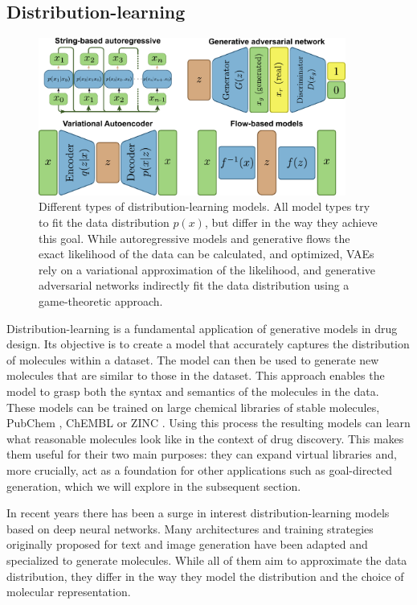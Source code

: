 \subsection{Distribution-learning}
\begin{figure}
      \centering
      \includegraphics[width=0.9\textwidth]{figures/distribution-learning-models.pdf}
      \caption{Different types of distribution-learning models. All model types
            try to fit the data distribution $p(x)$, but differ in the way they achieve this goal.
            While autoregressive models and generative flows the exact likelihood of the data can be calculated,
            and optimized, VAEs rely on a variational approximation of the likelihood, and generative adversarial networks
            indirectly fit the data distribution using a game-theoretic approach. \label{fig:distribution-learning-models}}
\end{figure}
Distribution-learning is a fundamental application of generative models in drug design. Its
objective is to create a model that accurately captures the distribution of molecules within a
dataset. The model can then be used to generate new molecules that are similar to those in the
dataset. This approach enables the model to grasp both the syntax and semantics of the
molecules in the data. These models can be trained on large chemical libraries of stable
molecules, PubChem \citep{kimPubChemSubstanceCompound2016}, ChEMBL \citep{bentoChEMBLBioactivityDatabase2014} or
ZINC \citep{irwinZINCFreeTool2012}. Using this process the resulting models can learn what reasonable molecules look like
in the context of drug discovery. This makes them useful for their two main purposes: they can
expand virtual libraries and, more crucially, act as a foundation for other applications such as
goal-directed generation, which we will explore in the subsequent section.

In recent years there has been a surge in interest distribution-learning models based on deep neural
networks. Many architectures and training strategies originally proposed for text and image
generation have been adapted and specialized to generate molecules. While all of them aim to
approximate the data distribution, they differ in the way they model the distribution and the choice
of molecular representation.

